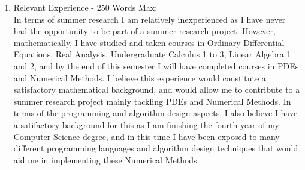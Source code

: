 \documentclass[11pt]{article}
\begin{document}
\begin{enumerate}
\item Relevant Experience - 250 Words Max: \\
In terms of summer research I am relatively inexperienced as I have never had the opportunity to be part of a summer research project. However, mathematically,
I have studied and taken courses in Ordinary Differential Equations, Real Analysis, Undergraduate Calculus 1 to 3, Linear Algebra 1 and 2, and by the end of
this semester I will have completed courses in PDEs and Numerical Methods. I believe this experience would constitute a satisfactory mathematical
background, and would allow me to contribute to a summer research project mainly tackling PDEs and Numerical Methods. In terms of the programming and algorithm design
aspects, I also believe I have a satifactory background for this as I am finishing the fourth year of my Computer Science degree, and in this time I have been
exposed to many different programming languages and algorithm design techniques that would aid me in implementing these Numerical Methods.

\end{enumerate}
\end{document}

